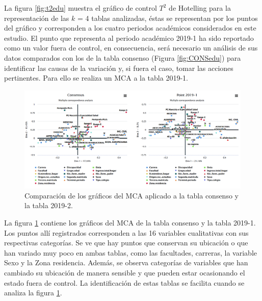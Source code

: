 \documentclass[water,article,submit,moreauthors,pdftex]{mdpi}
\begin{document}
La figura \ref{fig:t2edu} muestra el gráfico de control \(T^2\) de
Hotelling para la representación de las \(k\) = 4 tablas analizadas,
éstas se representan por los puntos del gráfico y corresponden a los
cuatro periodos académicos considerados en este estudio. El punto que
representa al periodo académico 2019-1 ha sido reportado como un valor
fuera de control, en consecuencia, será necesario un análisis de sus
datos comparados con los de la tabla consenso (Figura \ref{fig:CONSedu})
para identificar las causas de la variación y, si fuera el caso, tomar
las acciones pertinentes. Para ello se realiza un MCA a la tabla 2019-1.

\begin{figure}[!ht]



\begin{center}\includegraphics[width=0.9\linewidth,]{conspointedu} \end{center}

\caption{Comparación de los gráficos del MCA aplicado a la tabla consenso y la tabla 2019-2.}

\label{fig:conspointedu}
\end{figure}

La figura \ref{fig:conspointedu} contiene los gráficos del MCA de la
tabla consenso y la tabla 2019-1. Los puntos allí registrados
corresponden a las 16 variables cualitativas con sus respectivas
categorías. Se ve que hay puntos que conservan su ubicación o que han
variado muy poco en ambas tablas, como las facultades, carreras, la
variable Sexo y la Zona residencia. Además, se observa categorías de
variables que han cambiado su ubicación de manera sensible y que pueden
estar ocasionando el estado fuera de control. La identificación de estas
tablas se facilita cuando se analiza la figura \ref{fig:conspointedu}.
\end{document}
